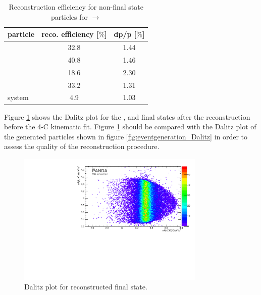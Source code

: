 		\begin{table}
		\centering
		\caption{\propose Reconstruction efficiency for non-final state particles for \pbarpSystem $\rightarrow$ \excitedanticascade \cascade}
		\label{tab:non-finalstate_efficiency_cc}
		
		\begin{tabular}{lcc}
		
			\hline
			particle & reco. efficiency [$\%$] & dp/p [$\%$] \\\hline
			\hline
			\lam & 32.8 &   1.44 \\
			\alam & 40.8 &   1.46\\
			\cascade & 18.6&   2.30\\
			\excitedanticascade & 33.2&   1.31\\
			\excitedanticascade \cascade system & 4.9&   1.03\\\hline
			 	
		\end{tabular}
	\end{table}
	
	Figure \ref{fig:reco_Dalitzplot} shows the Dalitz plot for the \anticascade, \lam and \kminus final states after the reconstruction before the 4-C kinematic fit. 
	Figure \ref{fig:reco_Dalitzplot} should be compared with the Dalitz plot of the generated particles shown in figure \ref{fig:eventgeneration_Dalitz}
	in order to assess the quality of the reconstruction procedure.
	
	\begin{figure}
		\centering
		\includegraphics[width=0.8\textwidth]{./plots/pbarp/Dalitzplot_reco.pdf}
		\caption{\propose Dalitz plot for reconstructed \anticascade\lam\kminus final state.}
		\label{fig:reco_Dalitzplot}
	
	\end{figure}
	
	